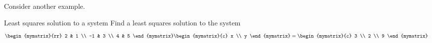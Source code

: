 Consider another example. 

\begin{example}{Least squares solution to a system}{}
Find a least squares solution to the system 
\begin{equation*}
\begin{mymatrix}{rr}
2 & 1 \\ 
-1 & 3 \\ 
4 & 5
\end{mymatrix} \begin{mymatrix}{c}
x \\ 
y
\end{mymatrix} =\begin{mymatrix}{c}
3 \\ 
2 \\ 
9
\end{mymatrix}
\end{equation*}
\end{example}

